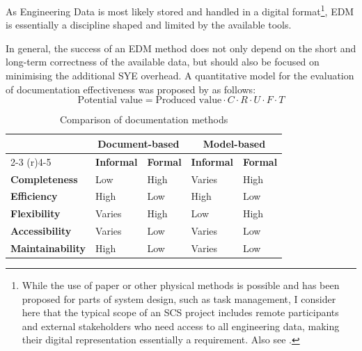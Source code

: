 \documentclass[a4paper,nobib,justified,final]{tufte-book}
\begin{document}
As Engineering Data is most likely stored and handled in a digital format\footnote[][-1cm]{While the use of paper or other physical methods is possible and has been proposed for parts of system design, such as task management, I consider here that the typical scope of an \acs{SCS} project includes remote participants and external stakeholders who need access to all engineering data, making their digital representation essentially a requirement. Also see .}, \ac{EDM} is essentially a discipline shaped and limited by the available tools. %

In general, the success of an \ac{EDM} method does not only depend on the short and long-term correctness of the available data, but should also be focused on minimising the additional \ac{SYE} overhead.
\NextCitationOffset{-0.6cm}
A quantitative model for the evaluation of documentation effectiveness was proposed by \citeauthor{amblerStrategiesAgileSoftware2008} \autocite{amblerStrategiesAgileSoftware2008} as follows:
\[
	\text{Potential value} = \text{Produced value} \cdot C \cdot R \cdot U \cdot F \cdot T
\]%

\begin{table}[h]
	\def\yes{\textcolor{Yes}{Yes}}
	\def\partially{\textcolor{Maybe}{Partially}}
	\def\no{\textcolor{No}{No}}
	\def\highbad{\textcolor{No}{High}}
	\def\highgood{\textcolor{Yes}{High}}
	\def\lowbad{\textcolor{No}{Low}}
	\def\lowgood{\textcolor{Yes}{Low}}
	\def\depends{\textcolor{Maybe}{Varies}}
	\centering
	\caption{Comparison of documentation methods}
	\label{tab:documentation}
	\begin{tabular}{@{}lllll@{}}
		\toprule
		& \multicolumn{2}{c}{Document-based} & \multicolumn{2}{c}{Model-based} \\ \cmidrule(r){2-3} \cmidrule(r){4-5}
		& \textbf{Informal} & \textbf{Formal} & \textbf{Informal} & \textbf{Formal} \\ \midrule
		\textbf{Completeness} & \lowbad  & \highgood  & \depends  & \highgood  \\
		\textbf{Efficiency} & \highgood & \lowbad  & \highgood & \lowbad \\
		\textbf{Flexibility} & \depends & \highgood  & \lowbad  & \highgood  \\
		\textbf{Accessibility} & \depends & \lowbad  & \depends  & \lowbad  \\
		\textbf{Maintainability} &  \highgood & \lowbad  & \depends & \lowbad \\
		\bottomrule
	\end{tabular}
\end{table}
\end{document}

